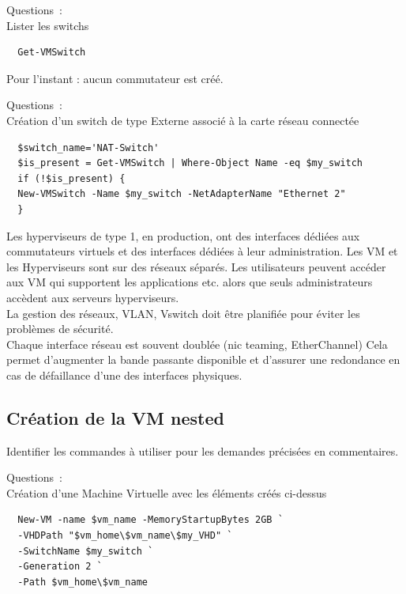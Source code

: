 \vspace{0.5cm}

Questions~: \\
Lister les switchs

\begin{verbatim}
  Get-VMSwitch
\end{verbatim}

\noindent Pour l'instant : aucun commutateur est créé.

\vspace{0.5cm}

Questions~: \\
Création d'un switch de type Externe associé à la carte réseau connectée

\begin{verbatim}
  $switch_name='NAT-Switch'
  $is_present = Get-VMSwitch | Where-Object Name -eq $my_switch
  if (!$is_present) {
  New-VMSwitch -Name $my_switch -NetAdapterName "Ethernet 2"
  }
\end{verbatim}

Les hyperviseurs de type 1, en production, ont des interfaces dédiées aux commutateurs virtuels et des interfaces dédiées à leur administration. Les VM et les Hyperviseurs sont sur des réseaux séparés. Les utilisateurs peuvent accéder aux VM qui supportent les applications etc. alors que seuls administrateurs accèdent aux serveurs hyperviseurs. \\
La gestion des réseaux, VLAN, Vswitch doit être planifiée pour éviter les problèmes de sécurité. \\
Chaque interface réseau est souvent doublée (nic teaming, EtherChannel) Cela permet d'augmenter la bande passante disponible et d'assurer une redondance en cas de défaillance d'une des interfaces physiques.

\newpage

\subsection*{Création de la VM nested}
{}
\noindent Identifier les commandes à utiliser pour les demandes précisées en commentaires.

\vspace{0.5cm}

Questions~: \\
Création d'une Machine Virtuelle avec les éléments créés ci-dessus

\begin{verbatim}
  New-VM -name $vm_name -MemoryStartupBytes 2GB `
  -VHDPath "$vm_home\$vm_name\$my_VHD" `
  -SwitchName $my_switch `
  -Generation 2 `
  -Path $vm_home\$vm_name
\end{verbatim}


